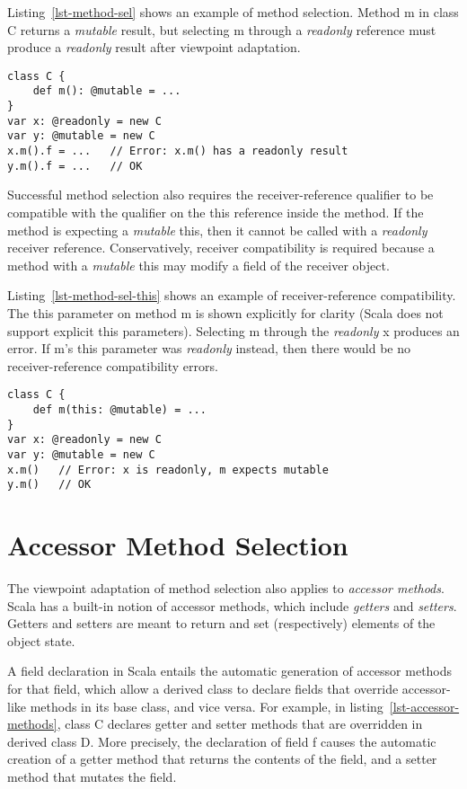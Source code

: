 Listing~\ref{lst-method-sel} shows an example of method selection.
Method {\cd m} in class {\cd C} returns a {\em mutable} result,
but selecting {\cd m} through a {\em readonly} reference must produce
a {\em readonly} result after viewpoint adaptation.

\begin{lstlisting}[caption={Method Selection},float={htp},label={lst-method-sel}]
class C {
	def m(): @mutable = ...
}
var x: @readonly = new C
var y: @mutable = new C
x.m().f = ...   // Error: x.m() has a readonly result
y.m().f = ...   // OK
\end{lstlisting}

Successful method selection also requires the receiver-reference qualifier to
be compatible with the qualifier on the {\cd this} reference inside the method.
If the method is expecting a {\em mutable} {\cd this}, then it cannot be called
with a {\em readonly} receiver reference.
Conservatively, receiver compatibility is required because a method
with a {\em mutable} {\cd this} may modify a field of the receiver object.

Listing~\ref{lst-method-sel-this} shows an example of receiver-reference compatibility.
The {\cd this} parameter on method {\cd m} is shown explicitly for clarity
(Scala does not support explicit {\cd this} parameters).
Selecting {\cd m} through the {\em readonly} {\cd x} produces an error.
If {\cd m}'s {\cd this} parameter was {\em readonly} instead, then there would be
no receiver-reference compatibility errors.

\begin{lstlisting}[caption={Method Selection, {\cd this} Compatibility},float={htp},label={lst-method-sel-this}]
class C {
	def m(this: @mutable) = ...
}
var x: @readonly = new C
var y: @mutable = new C
x.m()   // Error: x is readonly, m expects mutable
y.m()   // OK
\end{lstlisting}


\section{Accessor Method Selection} \label{sec-accessor-method-sel}

The viewpoint adaptation of method selection also applies to {\em accessor methods}.
Scala has a built-in notion of accessor methods, which include
{\em getters} and {\em setters}. Getters and setters are meant to return and set (respectively)
elements of the object state.

A field declaration in Scala entails the automatic generation of accessor methods
for that field, which allow a derived class to declare fields that override
accessor-like methods in its base class, and vice versa. For example,
in listing~\ref{lst-accessor-methods}, class {\cd C} declares getter and setter
methods that are overridden in derived class {\cd D}.
More precisely, the declaration of field {\cd f} causes the automatic creation of
a getter method that returns the contents of the field,
and a setter method that mutates the field.

